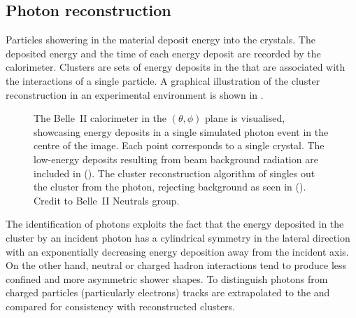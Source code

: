 \subsection{Photon reconstruction}\label{sec:neutrals}

Particles showering in the \ECL material deposit energy into the \ECL crystals.
The deposited energy and the time of each energy deposit are recorded by the calorimeter.
Clusters are sets of energy deposits in the \ECL that are associated with the interactions of a single particle.
A graphical illustration of the cluster reconstruction in an experimental environment is shown in .
\begin{figure}[hbtp!]
    \centering
    \caption{\label{fig:clustering}
    The Belle~II calorimeter in the $(\theta,\phi)$ plane is visualised, 
    showcasing energy deposits in a single simulated photon event in the centre of the image.
    Each point corresponds to a single \ECL crystal.
    The low-energy deposits resulting from beam background radiation are included in ().
    The cluster reconstruction algorithm of \basftwo singles out the cluster from the photon, 
    rejecting background as seen in ().
    Credit to Belle~II Neutrals group.
    }
\end{figure}

The identification of photons exploits the fact that the energy deposited in the cluster
by an incident photon has a cylindrical symmetry in the lateral direction with an exponentially decreasing energy deposition away from the incident axis.
On the other hand, neutral or charged hadron interactions tend to produce less confined and more asymmetric shower shapes.
To distinguish photons from charged particles (particularly electrons) tracks are extrapolated to the \ECL and compared for consistency with reconstructed clusters.
